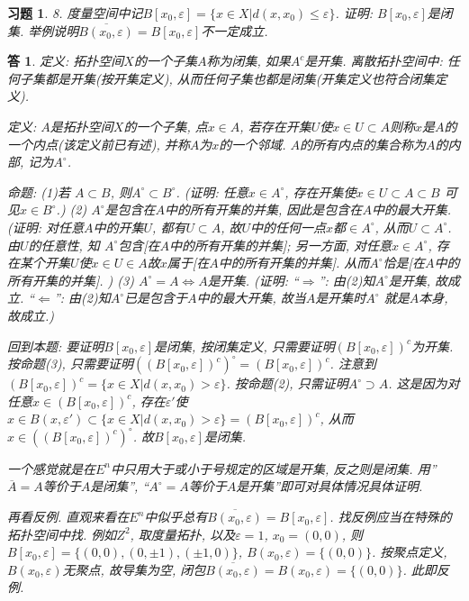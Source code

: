 \documentclass{ctexart}%
\newtheorem*{exercise}{习题}
\newtheorem*{solution}{答}
\theoremstyle{definition}
\theoremstyle{remark}
\begin{document}
\begin{exercise}8. 度量空间中记$B[x_0,\varepsilon]=\{x\in X|d(x,x_0)\leq \varepsilon\}$. 证明: $B[x_0,\varepsilon]$是闭集. 举例说明$\overline{B(x_0,\varepsilon)}=B[x_0,\varepsilon]$不一定成立. 
\end{exercise}
\begin{solution}定义: 拓扑空间$X$的一个子集$A$称为闭集, 如果$A^c$是开集. 离散拓扑空间中: 任何子集都是开集(按开集定义), 从而任何子集也都是闭集(开集定义也符合闭集定义). 

定义: $A$是拓扑空间$X$的一个子集, 点$x\in A$, 若存在开集$U$使$x\in U \subset A$则称$x$是$A$的一个内点(该定义前已有述), 并称$A$为$x$的一个邻域. $A$的所有内点的集合称为$A$的内部, 记为$A^\circ$.

命题: (1)若 $A\subset B$, 则$A^\circ\subset B^\circ$. (证明: 任意$x \in A^\circ$, 存在开集使$x\in U\subset A\subset B$ 可见$x \in B^\circ$.) (2) $A^\circ$是包含在$A$中的所有开集的并集, 因此是包含在$A$中的最大开集. (证明: 对任意$A$中的开集$U$, 都有$U\subset A$, 故$U$中的任何一点$x$都$\in A^\circ$, 从而$U\subset A^\circ$. 由$U$的任意性, 知 $A^\circ$包含[在$A$中的所有开集的并集]; 另一方面, 对任意$x\in A^\circ$, 存在某个开集$U$使$x\in U\in A$故$x$属于[在$A$中的所有开集的并集]. 从而$A^\circ$恰是[在$A$中的所有开集的并集]. ) (3) $A^\circ=A \Longleftrightarrow A$是开集. (证明: ``$\Longrightarrow$'': 由(2)知$A^\circ$是开集, 故成立. ``$\Longleftarrow$'': 由(2)知$A^\circ$已是包含于$A$中的最大开集, 故当$A$是开集时$A^\circ$ 就是$A$本身, 故成立.)

 回到本题: 要证明$B[x_0,\varepsilon]$是闭集, 按闭集定义, 只需要证明$(B[x_0,\varepsilon])^c$为开集. 按命题(3), 只需要证明$ ((B[x_0,\varepsilon])^c)^\circ=(B[x_0,\varepsilon])^c$. 注意到$(B[x_0,\varepsilon])^c=\{x\in X|d(x,x_0)>\varepsilon\}$. 按命题(2), 只需证明$A^\circ \supset A$. 这是因为对任意$x\in (B[x_0,\varepsilon])^c$, 存在$\varepsilon'$使$x \in B(x,\varepsilon')\subset \{x\in X|d(x,x_0)>\varepsilon\}=(B[x_0,\varepsilon])^c$, 从而$x\in ((B[x_0,\varepsilon])^c)^\circ$. 故$B[x_0,\varepsilon]$是闭集.
 
 一个感觉就是在$E^n$中只用大于或小于号规定的区域是开集, 反之则是闭集. 用''$\overline{A}=A$等价于$A$是闭集'', ``$A^\circ=A$等价于$A$是开集''即可对具体情况具体证明. 
 
再看反例. 直观来看在$E^n$中似乎总有$\overline{B(x_0,\varepsilon)}=B[x_0,\varepsilon]$. 找反例应当在特殊的拓扑空间中找. 例如$Z^2$, 取度量拓扑, 以及$\varepsilon=1$, $x_0=(0,0)$, 则$B[x_0,\varepsilon]=\{(0,0),(0,\pm1),(\pm1, 0)\}$, $B(x_0,\varepsilon)=\{(0,0)\}$. 按聚点定义, $B(x_0,\varepsilon)$无聚点, 故导集为空, 闭包$\overline{B(x_0,\varepsilon)}=B(x_0,\varepsilon)=\{(0,0)\}$. 此即反例.
\end{solution}
\end{document}
